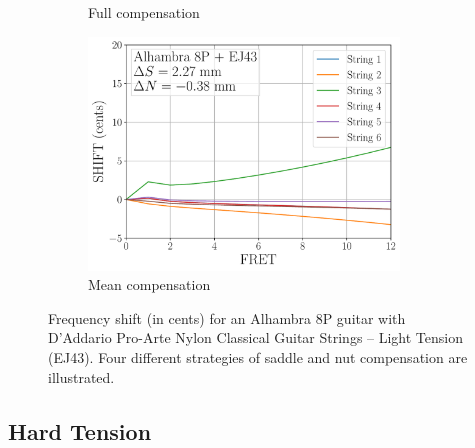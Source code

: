 \begin{figure}
\begin{subfigure}[b]{0.45\textwidth}
   \caption{Full compensation}
   \label{fig:shift_alhambra8p_ej43_full}
  \end{subfigure}
  \hspace{0.25in}
  \begin{subfigure}[b]{0.45\textwidth}
   \centering
   \includegraphics[width=3.25in]{figures/shift_alhambra8p_ej43_mean}
   \caption{Mean compensation}
   \label{fig:shift_alhambra8p_ej43_mean}
  \end{subfigure}
  \caption{\label{fig:compensation_alhambra8p_ej43} Frequency shift (in cents) for an Alhambra 8P guitar with D'Addario Pro-Arte Nylon Classical Guitar Strings -- Light Tension (EJ43). Four different strategies of saddle and nut compensation are illustrated.}
 \end{figure}

 \newpage
 \subsection{Hard Tension}


